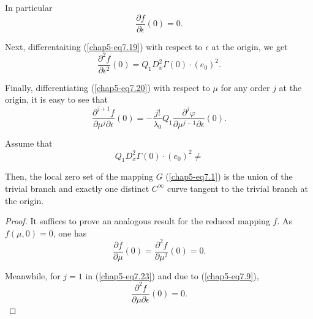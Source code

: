 In particular
\begin{equation*}
\frac{\partial f}{\partial \epsilon} (0) = 0.\tag{7.21}\label{chap5-eq7.21}
\end{equation*}

Next, differentaiting (\ref{chap5-eq7.19}) with respect to $\epsilon$
at the origin, we get
\begin{equation*}
\frac{\partial^{2} f}{\partial \epsilon^{2}} (0) =
Q_{1}D_{x}^{2}\Gamma(0) \cdot (e_{0})^{2}.\tag{7.22}\label{chap5-eq7.22}
\end{equation*}

Finally, differentiating (\ref{chap5-eq7.20}) with respect to $\mu$
for any order $j$ at the origin, it is easy to see that
\begin{equation*}
\frac{\partial^{j+1} f}{\partial \mu^{j} \partial \epsilon} (0) = -
\frac{j!}{\lambda_{0}} Q_{1} \frac{\partial^{j} \varphi}{\partial
  \mu^{j-1} \partial \epsilon} (0).\tag{7.23}\label{chap5-eq7.23}
\end{equation*}

\begin{theorem}\label{chap5-thm7.1}
Assume that
\begin{equation*}
Q_{1}D_{x}^{2}\Gamma(0) \cdot (e_{0})^{2} \neq \tag{7.24}\label{chap5-eq7.24}
\end{equation*}

Then, the local zero set of the mapping $G$ (\ref{chap5-eq7.1}) is the
union of the trivial branch and exactly one distinct $C^{\infty}$
curve tangent to the trivial branch at the origin.
\end{theorem}

\begin{proof}
It suffices to prove an analogous result for the reduced mapping $f$. As
$f(\mu, 0) = 0$, one has
\begin{equation*}
\frac{\partial f}{\partial \mu} (0) = \frac{\partial^{2}f}{\partial
  \mu^{2}} (0) = 0.\tag{7.25}\label{chap5-eq7.25}
\end{equation*}

Meanwhile, for $j = 1$ in (\ref{chap5-eq7.23}) and due to
(\ref{chap5-eq7.9}),
\begin{equation*}
\frac{\partial^{2}f}{\partial \mu \partial \epsilon} (0) =
0.\tag{7.26}\label{chap5-eq7.26} 
\end{equation*}
\end{proof}

